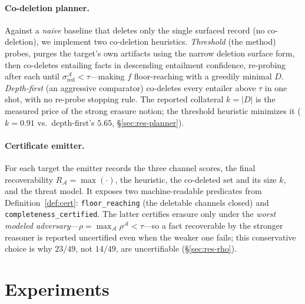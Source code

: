 \documentclass[10pt,twocolumn,letterpaper]{article}
\theoremstyle{definition}
\theoremstyle{plain}
\newcommand{\sred}{\sigma_{\mathrm{red}}}
\newcommand{\Rec}{R}
\newcommand{\Adv}{\mathcal{A}}
\newcommand{\code}[1]{\texttt{#1}}
\begin{document}
\paragraph{Co-deletion planner.}
Against a \emph{naive} baseline that deletes only the single surfaced record (no
co-deletion), we implement two co-deletion heuristics. \emph{Threshold} (the
method) probes, purges the target's own artifacts using the narrow deletion
surface form, then co-deletes entailing facts in descending entailment confidence,
re-probing after each until $\sred^{\Adv}<\tau$---making $f$ floor-reaching with a
greedily minimal $D$. \emph{Depth-first} (an aggressive comparator) co-deletes
every entailer above $\tau$ in one shot, with no re-probe stopping rule. The
reported collateral $k=|D|$ is the measured price of the strong erasure notion;
the threshold heuristic minimizes it ($k=0.91$ vs.\ depth-first's $5.65$,
\S\ref{sec:res-planner}).

\paragraph{Certificate emitter.}
For each target the emitter records the three channel scores, the final
recoverability $\Rec_{\Adv}=\max(\cdot)$, the heuristic, the co-deleted set and its
size $k$, and the threat model. It exposes two machine-readable predicates from
Definition~\ref{def:cert}: \code{floor\_reaching} (the deletable channels closed)
and \code{completeness\_certified}. The latter certifies erasure only under the
\emph{worst modeled adversary}---$\rho=\max_{\Adv}\rho^{\Adv}<\tau$---so a fact
recoverable by the stronger reasoner is reported uncertified even when the weaker
one fails; this conservative choice is why $23/49$, not $14/49$, are uncertifiable
(\S\ref{sec:res-rho}).

\section{Experiments}\label{sec:results}
\end{document}
